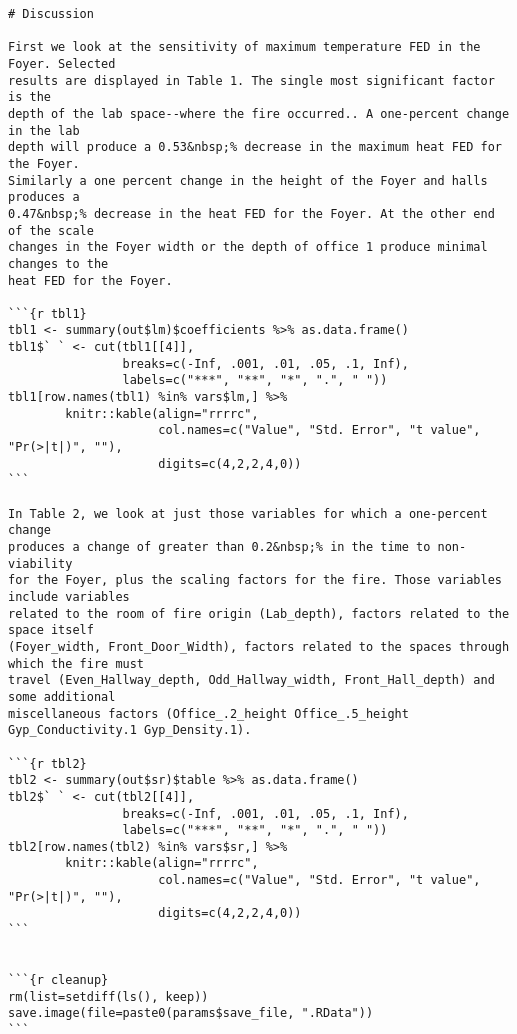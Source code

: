 \begin{lstlisting}[basicstyle=\scriptsize]
# Discussion

First we look at the sensitivity of maximum temperature FED in the Foyer. Selected
results are displayed in Table 1. The single most significant factor is the
depth of the lab space--where the fire occurred.. A one-percent change in the lab
depth will produce a 0.53&nbsp;% decrease in the maximum heat FED for the Foyer.
Similarly a one percent change in the height of the Foyer and halls produces a
0.47&nbsp;% decrease in the heat FED for the Foyer. At the other end of the scale
changes in the Foyer width or the depth of office 1 produce minimal changes to the
heat FED for the Foyer.

```{r tbl1}
tbl1 <- summary(out$lm)$coefficients %>% as.data.frame()
tbl1$` ` <- cut(tbl1[[4]],
                breaks=c(-Inf, .001, .01, .05, .1, Inf),
                labels=c("***", "**", "*", ".", " "))
tbl1[row.names(tbl1) %in% vars$lm,] %>%
        knitr::kable(align="rrrrc",
                     col.names=c("Value", "Std. Error", "t value", "Pr(>|t|)", ""),
                     digits=c(4,2,2,4,0))
```

In Table 2, we look at just those variables for which a one-percent change
produces a change of greater than 0.2&nbsp;% in the time to non-viability
for the Foyer, plus the scaling factors for the fire. Those variables include variables
related to the room of fire origin (Lab_depth), factors related to the space itself
(Foyer_width, Front_Door_Width), factors related to the spaces through which the fire must
travel (Even_Hallway_depth, Odd_Hallway_width, Front_Hall_depth) and some additional
miscellaneous factors (Office_.2_height Office_.5_height Gyp_Conductivity.1 Gyp_Density.1).

```{r tbl2}
tbl2 <- summary(out$sr)$table %>% as.data.frame()
tbl2$` ` <- cut(tbl2[[4]],
                breaks=c(-Inf, .001, .01, .05, .1, Inf),
                labels=c("***", "**", "*", ".", " "))
tbl2[row.names(tbl2) %in% vars$sr,] %>%
        knitr::kable(align="rrrrc",
                     col.names=c("Value", "Std. Error", "t value", "Pr(>|t|)", ""),
                     digits=c(4,2,2,4,0))
```


```{r cleanup}
rm(list=setdiff(ls(), keep))
save.image(file=paste0(params$save_file, ".RData"))
```

\end{lstlisting} 